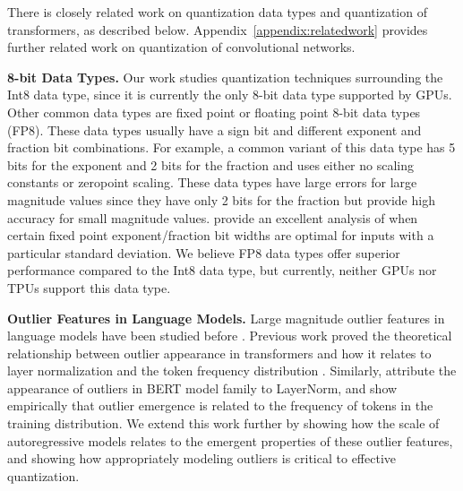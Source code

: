 \documentclass{article}
\begin{document}
There is closely related work on quantization data types and quantization of transformers, as described below. Appendix~\ref{appendix:relatedwork} provides further related work on quantization of convolutional networks.

\textbf{8-bit Data Types.} Our work studies quantization techniques surrounding the Int8 data type, since it is currently the only 8-bit data type supported by GPUs. Other common data types are fixed point or floating point 8-bit data types (FP8). These data types usually have a sign bit and different exponent and fraction bit combinations. For example, a common variant of this data type has 5 bits for the exponent and 2 bits for the fraction \citep{wang2018training8bit,sun2019hybrid8bit,cambier2020shiftsqueeze,mellempudi2019bit8} and uses either no scaling constants or zeropoint scaling. These data types have large errors for large magnitude values since they have only 2 bits for the fraction but provide high accuracy for small magnitude values.
\citet{jin2022f8net} provide an excellent analysis of when certain fixed point exponent/fraction bit widths are optimal for inputs with a particular standard deviation. We believe FP8 data types offer superior performance compared to the Int8 data type, but currently, neither GPUs nor TPUs support this data type.

\textbf{Outlier Features in Language Models.} Large magnitude outlier features in language models have been studied before \citep{timkey2021all,bondarenko2021understanding, wei2022outlier,luo-etal-2021-positional}. Previous work proved the theoretical relationship between outlier appearance in transformers and how it relates to layer normalization and the token frequency distribution \citep{gao2019representation}. Similarly, \citet{kovaleva2021bert} attribute the appearance of outliers in BERT model family to LayerNorm, and \citet{puccetti2022outliers} show empirically that outlier emergence is related to the frequency of tokens in the training distribution. We extend this work further by showing how the scale of autoregressive models relates to the emergent properties of these outlier features, and showing how appropriately modeling outliers is critical to effective quantization. 
\end{document}
